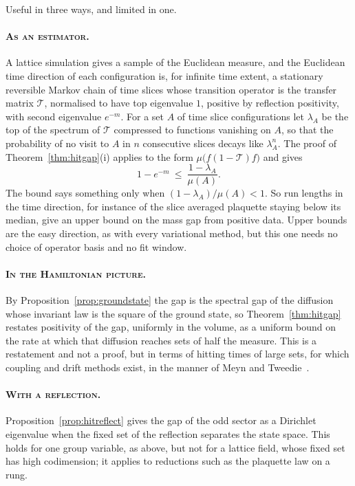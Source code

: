 Useful in three ways, and limited in one.

\paragraph{\normalfont\scshape As an estimator.} A lattice simulation gives a sample of the Euclidean measure, and the Euclidean time direction of each configuration is, for infinite time extent, a stationary reversible Markov chain of time slices whose transition operator is the transfer matrix $\mathcal T$, normalised to have top eigenvalue $1$, positive by reflection positivity, with second eigenvalue $e^{-m}$. For a set $A$ of time slice configurations let $\lambda_A$ be the top of the spectrum of $\mathcal T$ compressed to functions vanishing on $A$, so that the probability of no visit to $A$ in $n$ consecutive slices decays like $\lambda_A^n$. The proof of Theorem~\ref{thm:hitgap}(i) applies to the form $\mu\big(f(1-\mathcal T)f\big)$ and gives
\[
1-e^{-m}\ \le\ \frac{1-\lambda_A}{\mu(A)} .
\]
The bound says something only when $(1-\lambda_A)/\mu(A)<1$. So run lengths in the time direction, for instance of the slice averaged plaquette staying below its median, give an upper bound on the mass gap from positive data. Upper bounds are the easy direction, as with every variational method, but this one needs no choice of operator basis and no fit window.

\paragraph{\normalfont\scshape In the Hamiltonian picture.} By Proposition~\ref{prop:groundstate} the gap is the spectral gap of the diffusion whose invariant law is the square of the ground state, so Theorem~\ref{thm:hitgap} restates positivity of the gap, uniformly in the volume, as a uniform bound on the rate at which that diffusion reaches sets of half the measure. This is a restatement and not a proof, but in terms of hitting times of large sets, for which coupling and drift methods exist, in the manner of Meyn and Tweedie~\cite{MT93}.

\paragraph{\normalfont\scshape With a reflection.} Proposition~\ref{prop:hitreflect} gives the gap of the odd sector as a Dirichlet eigenvalue when the fixed set of the reflection separates the state space. This holds for one group variable, as above, but not for a lattice field, whose fixed set has high codimension; it applies to reductions such as the plaquette law on a rung.

